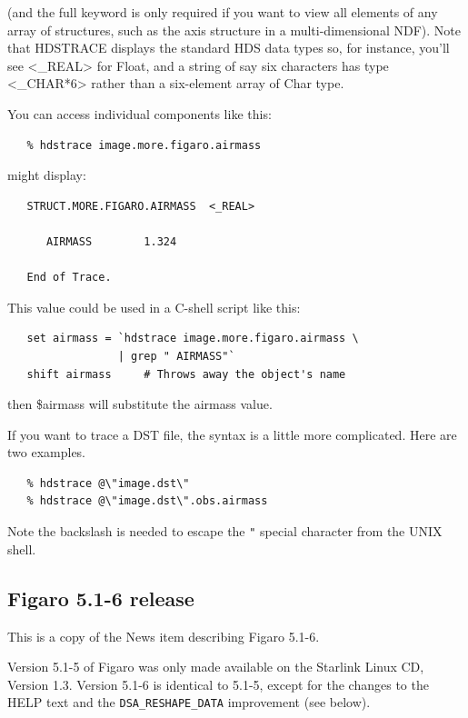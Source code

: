 \documentclass[11pt,twoside]{article}
\begin{document}
   (and the full keyword is only required if you want to view
   all elements of any array of structures, such as the axis
   structure in a multi-dimensional NDF).  Note that HDSTRACE
   displays the standard HDS data types so, for instance,
   you'll see <\_REAL> for Float, and a string of say six
   characters has type <\_CHAR*6> rather than a six-element
   array of Char type.


   You can access individual components like this:

\begin{verbatim}
   % hdstrace image.more.figaro.airmass
\end{verbatim}

   might display:

\begin{verbatim}
   STRUCT.MORE.FIGARO.AIRMASS  <_REAL>

      AIRMASS        1.324

   End of Trace.
\end{verbatim}

   This value could be used in a C-shell script like this:

\begin{verbatim}
   set airmass = `hdstrace image.more.figaro.airmass \
                 | grep " AIRMASS"`
   shift airmass     # Throws away the object's name
\end{verbatim}

   then \$airmass will substitute the airmass value.


   If you want to trace a DST file, the syntax is a little
   more complicated.  Here are two examples.

\begin{verbatim}
   % hdstrace @\"image.dst\"
   % hdstrace @\"image.dst\".obs.airmass
\end{verbatim}

   Note the backslash is needed to escape the \verb+"+ special
   character from the UNIX shell.


\subsection{\label{news516}Figaro 5.1-6 release}

 This is a copy of the News item describing Figaro 5.1-6.

 Version 5.1-5 of Figaro was only made available on the Starlink Linux
 CD, Version 1.3.  Version 5.1-6 is identical to 5.1-5, except for
 the changes to the HELP text and the \verb+DSA_RESHAPE_DATA+
 improvement (see below).
\end{document}
